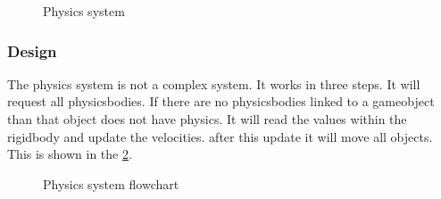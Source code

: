 \documentclass{projdoc}
\begin{document}
\begin{figure}
	\centering
	\caption{Physics system}
	\label{fig:physics-system}
\end{figure}

\subsubsection{Design}

The physics system is not a complex system. It works in three steps. It will request
all physicsbodies. If there are no physicsbodies linked to a gameobject than that
object does not have physics. It will read the values within the rigidbody and update
the velocities. after this update it will move all objects. This is shown in the
\cref{fig:physics-system-flowchart}.

\begin{figure}
	\centering
	\caption{Physics system flowchart}
	\label{fig:physics-system-flowchart}
\end{figure}
\end{document}
